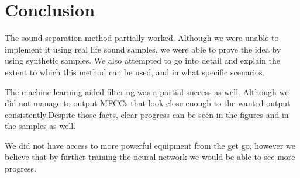 \chapter{Conclusion}\label{ch:conclusion}
The sound separation method partially worked. Although we were unable to implement it using
real life sound samples, we were able to prove the idea by using synthetic samples. We also
attempted to go into detail and explain the extent to which this method can be used, and in 
what specific scenarios.

The machine learning aided filtering was a partial success as well. Although we did not
manage to output MFCCs that look close enough to the wanted output consistently.Despite those facts, clear progress can be seen in the figures and in the samples as well.

We did not have access to more powerful equipment from the get go, however we believe
that by further training the neural network we would be able to see more progress.

